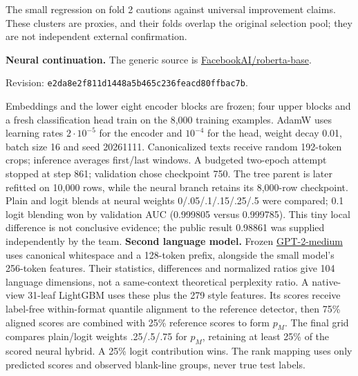 \documentclass[10pt,letterpaper]{article}
\begin{document}
\par
The small regression on fold 2 cautions against universal improvement claims. These clusters are proxies, and their folds overlap the original selection pool; they are not independent external confirmation.

\textbf{Neural continuation.} The generic source is \href{https://huggingface.co/FacebookAI/roberta-base}{FacebookAI/roberta-base}.\par
Revision: \texttt{e2da8e2f811d1448a5b465c236feacd80ffbac7b}.\par
Embeddings and the lower eight encoder blocks are frozen; four upper blocks and a fresh classification head train on the 8,000 training examples. AdamW uses learning rates $2\cdot10^{-5}$ for the encoder and $10^{-4}$ for the head, weight decay 0.01, batch size 16 and seed 20261111.
Canonicalized texts receive random 192-token crops; inference averages first/last windows. A budgeted two-epoch attempt stopped at step 861; validation chose checkpoint 750. The tree parent is later refitted on 10,000 rows, while the neural branch retains its 8,000-row checkpoint.
Plain and logit blends at neural weights 0/.05/.1/.15/.25/.5 were compared; 0.1 logit blending won by validation AUC (0.999805 versus 0.999785). This tiny local difference is not conclusive evidence; the public result 0.98861 was supplied independently by the team.
\textbf{Second language model.} Frozen \href{https://huggingface.co/openai-community/gpt2-medium}{GPT-2-medium} uses canonical whitespace and a 128-token prefix, alongside the small model's 256-token features. Their statistics, differences and normalized ratios give 104 language dimensions, not a same-context theoretical perplexity ratio. A native-view 31-leaf LightGBM uses these plus the 279 style features. Its scores receive label-free within-format quantile alignment to the reference detector, then 75\% aligned scores are combined with 25\% reference scores to form $p_M$. The final grid compares plain/logit weights .25/.5/.75 for $p_M$, retaining at least 25\% of the scored neural hybrid. A 25\% logit contribution wins. The rank mapping uses only predicted scores and observed blank-line groups, never true test labels.
\end{document}
